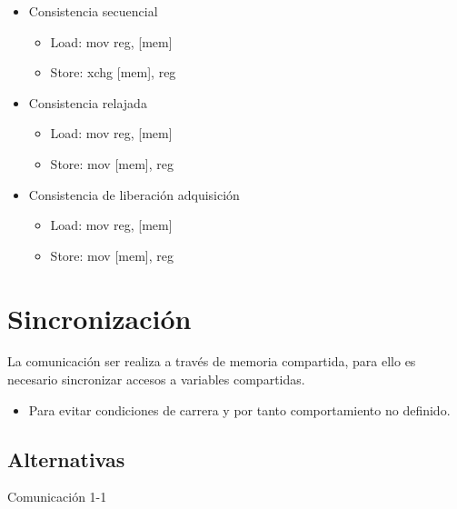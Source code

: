 \documentclass[12pt, twoside, openright]{report} %
\begin{document}
\begin{itemize}
  \item Consistencia secuencial 

  \begin{itemize}
  \item Load: mov reg, {[}mem{]}
  \item
    Store: xchg {[}mem{]}, reg
  \end{itemize}
  \item
    Consistencia relajada
    \begin{itemize}
  \item
    Load: mov reg, {[}mem{]}

    \item
      Store: mov {[}mem{]}, reg

    \end{itemize}

    \item Consistencia de liberación adquisición 

  \begin{itemize}
  \item Load: mov reg, {[}mem{]}
  \item
    Store: mov {[}mem{]}, reg
  \end{itemize}
\end{itemize}
    

    
\section{Sincronización}


  La comunicación ser realiza a través de memoria compartida, para
  ello es necesario sincronizar accesos a variables compartidas.

  \begin{itemize}
  
  \item
    Para evitar condiciones de carrera y por tanto comportamiento no
    definido.
  \end{itemize}

  \subsection{Alternativas}

  
  
    Comunicación 1-1
\end{document}
